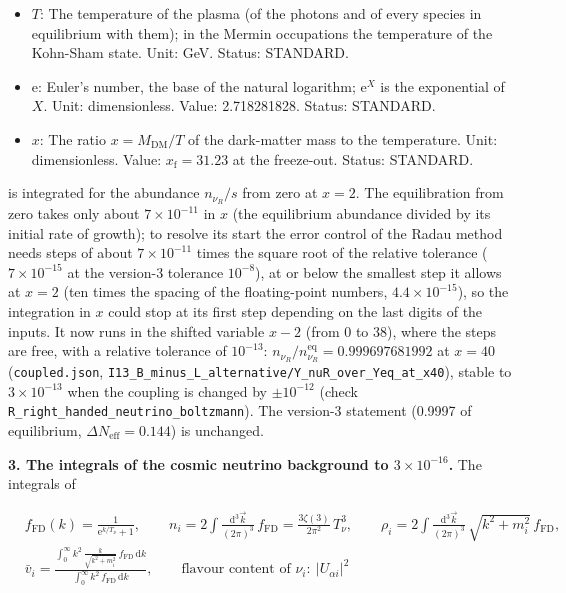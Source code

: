 \documentclass[
  10pt,
]{article}
\begin{document}
\begin{itemize}
\item
  \(T\): The temperature of the plasma (of the photons and of every
  species in equilibrium with them); in the Mermin occupations the
  temperature of the Kohn-Sham state. Unit: GeV. Status: STANDARD.
\item
  \(\mathrm{e}\): Euler's number, the base of the natural logarithm;
  \(\mathrm{e}^{X}\) is the exponential of \(X\). Unit: dimensionless.
  Value: 2.718281828. Status: STANDARD.
\item
  \(x\): The ratio \(x = M_{\mathrm{DM}}/T\) of the dark-matter mass to
  the temperature. Unit: dimensionless. Value:
  \(x_{\mathrm{f}} = 31.23\) at the freeze-out. Status: STANDARD.
\end{itemize}

is integrated for the abundance \(n_{\nu_R}/s\) from zero at \(x = 2\).
The equilibration from zero takes only about \(7\times10^{-11}\) in
\(x\) (the equilibrium abundance divided by its initial rate of growth);
to resolve its start the error control of the Radau method needs steps
of about \(7\times10^{-11}\) times the square root of the relative
tolerance (\(7\times10^{-15}\) at the version-3 tolerance \(10^{-8}\)),
at or below the smallest step it allows at \(x = 2\) (ten times the
spacing of the floating-point numbers, \(4.4\times10^{-15}\)), so the
integration in \(x\) could stop at its first step depending on the last
digits of the inputs. It now runs in the shifted variable \(x - 2\)
(from 0 to 38), where the steps are free, with a relative tolerance of
\(10^{-13}\): \(n_{\nu_R}/n_{\nu_R}^{\mathrm{eq}} = 0.999697681992\) at
\(x = 40\) (\texttt{coupled.json},
\texttt{I13\_B\_minus\_L\_alternative/Y\_nuR\_over\_Yeq\_at\_x40}),
stable to \(3\times10^{-13}\) when the coupling is changed by
\(\pm10^{-12}\) (check \texttt{R\_right\_handed\_neutrino\_boltzmann}).
The version-3 statement (0.9997 of equilibrium,
\(\Delta N_{\mathrm{eff}} = 0.144\)) is unchanged.

\textbf{3. The integrals of the cosmic neutrino background to
\(3\times10^{-16}\).} The integrals of

\[
\begin{aligned}
&f_{\mathrm{FD}}(k) = \frac{1}{\mathrm{e}^{k/T_\nu} + 1},\qquad
 n_i = 2\int\frac{\mathrm{d}^3\vec k}{(2\pi)^3}\,f_{\mathrm{FD}} = \frac{3\zeta(3)}{2\pi^2}\,T_\nu^3,\qquad
 \rho_i = 2\int\frac{\mathrm{d}^3\vec k}{(2\pi)^3}\,\sqrt{k^2 + m_i^2}\,f_{\mathrm{FD}},\\
&\bar v_i = \frac{\int_0^\infty k^2\,\frac{k}{\sqrt{k^2 +
 m_i^2}}\,f_{\mathrm{FD}}\,\mathrm{d}k}{\int_0^\infty k^2\,f_{\mathrm{FD}}\,\mathrm{d}k},
 \qquad \text{flavour content of }\nu_i:\ \lvert U_{\alpha i}\rvert^2
\end{aligned} \tag{FE-120}
\]
\end{document}
